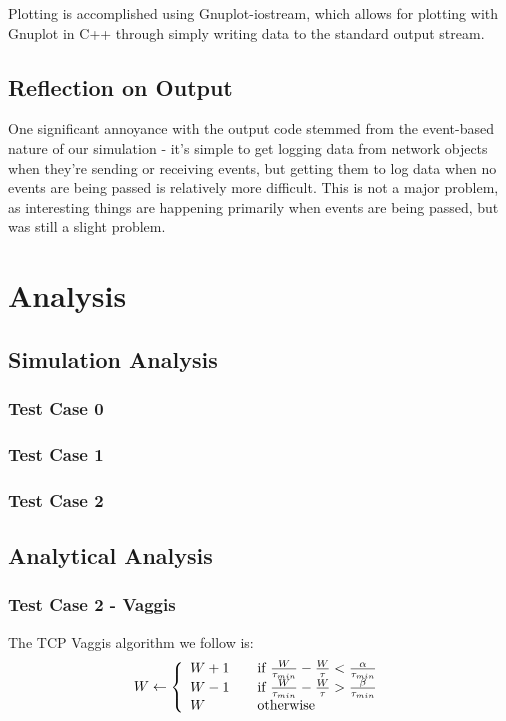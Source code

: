\documentclass[12pt]{article}
\begin{document}
Plotting is accomplished using Gnuplot-iostream, which allows for plotting with Gnuplot in C++ through simply writing data to the standard output stream.

\subsection*{Reflection on Output}
One significant annoyance with the output code stemmed from the event-based nature of our simulation - it’s simple to get logging data from network objects when they’re sending or receiving events, but getting them to log data when no events are being passed is relatively more difficult. This is not a major problem, as interesting things are happening primarily when events are being passed, but was still a slight problem.


\section{Analysis}


\subsection{Simulation Analysis}
\subsubsection{Test Case 0}
\subsubsection{Test Case 1}
\subsubsection{Test Case 2}


\subsection{Analytical Analysis}
\subsubsection{Test Case 2 - Vaggis}


The TCP Vaggis algorithm we follow is:
\[ W \leftarrow \left\{
  \begin{array}{l l}
    W+1 & \quad \text{if }\frac{W}{\tau_{min}} - \frac{W}{\tau} < \frac{\alpha}{\tau_{min}}\\
    W-1 & \quad \text{if }\frac{W}{\tau_{min}} - \frac{W}{\tau} > \frac{\beta}{\tau_{min}}\\
    W & \quad \text{otherwise}\\
  \end{array} \right.\]
\end{document}

